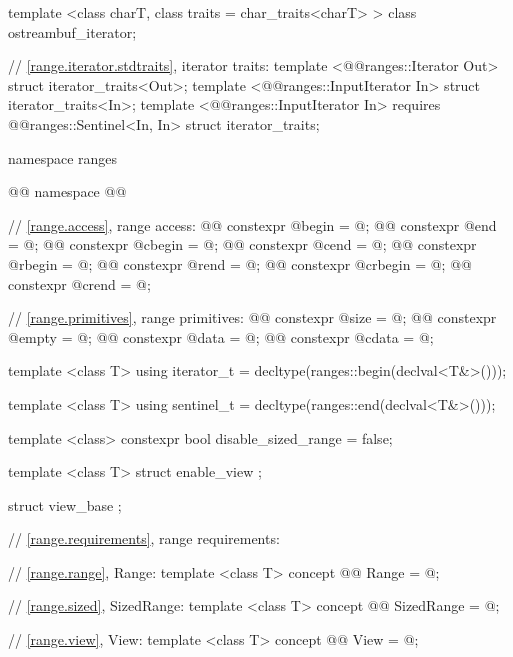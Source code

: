 {\begin{codeblock}
{{    template <class charT, class traits = char_traits<charT> >
      class ostreambuf_iterator;
  }

  // \ref{range.iterator.stdtraits}, iterator traits:
  template <@@ranges::Iterator Out>
    struct iterator_traits<Out>;
  template <@@ranges::InputIterator In>
    struct iterator_traits<In>;
  template <@@ranges::InputIterator In>
      requires @@ranges::Sentinel<In, In>
    struct iterator_traits;

  namespace ranges {
    @@ namespace @\newtxt{\unspec}@ {
      // \ref{range.access}, range access:
      @@ constexpr @\unspec@ begin = @\unspec@;
      @@ constexpr @\unspec@ end = @\unspec@;
      @@ constexpr @\unspec@ cbegin = @\unspec@;
      @@ constexpr @\unspec@ cend = @\unspec@;
      @@ constexpr @\unspec@ rbegin = @\unspec@;
      @@ constexpr @\unspec@ rend = @\unspec@;
      @@ constexpr @\unspec@ crbegin = @\unspec@;
      @@ constexpr @\unspec@ crend = @\unspec@;

      // \ref{range.primitives}, range primitives:
      @@ constexpr @\unspec@ size = @\unspec@;
      @@ constexpr @\unspec@ empty = @\unspec@;
      @@ constexpr @\unspec@ data = @\unspec@;
      @@ constexpr @\unspec@ cdata = @\unspec@;
    }

    template <class T>
    using iterator_t = decltype(ranges::begin(declval<T&>()));

    template <class T>
    using sentinel_t = decltype(ranges::end(declval<T&>()));

    template <class>
    constexpr bool disable_sized_range = false;

    template <class T>
    struct enable_view { };

    struct view_base { };

    // \ref{range.requirements}, range requirements:

    // \ref{range.range}, Range:
    template <class T>
    concept @@ Range = @\seebelow@;

    // \ref{range.sized}, SizedRange:
    template <class T>
    concept @@ SizedRange = @\seebelow@;

    // \ref{range.view}, View:
    template <class T>
    concept @@ View = @\seebelow@;

}}
\end{codeblock}}
